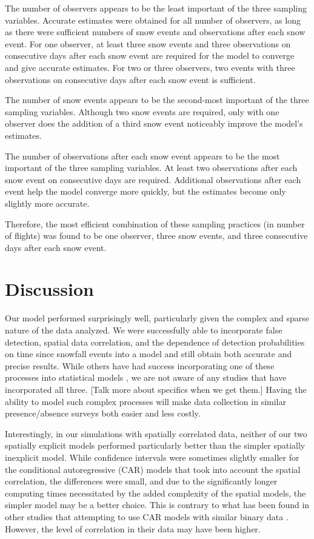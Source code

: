 \documentclass[11pt]{article}
\begin{document}
    The number of observers appears to be the least important of the three
    sampling variables.  Accurate estimates were obtained for all number of
    observers, as long as there were sufficient numbers of snow events and
    observations after each snow event.  For one observer, at least three snow
    events and three observations on consecutive days after each snow event are
    required for the model to converge and give accurate estimates.  For two or
    three observers, two events with three observations on consecutive days
    after each snow event is sufficient.

    The number of snow events appears to be the second-most important of the
    three sampling variables.  Although two snow events are required, only with
    one observer does the addition of a third snow event noticeably improve the
    model's estimates.

    The number of observations after each snow event appears to be the most
    important of the three sampling variables.  At least two observations after
    each snow event on consecutive days are required.  Additional observations
    after each event help the model converge more quickly, but the estimates
    become only slightly more accurate.

    Therefore, the most efficient combination of these sampling practices (in
    number of flights)  was found to be one observer, three snow events, and
    three consecutive days after each snow event.

\section{Discussion}

Our model performed surprisingly well, particularly given the complex and
sparse nature of the data analyzed. We were successfully able to incorporate
false detection, spatial data correlation, and the dependence of detection
probabilities on time since snowfall events into a model and still obtain both
accurate and precise results. While others have had success incorporating one
of these processes into statistical models \citep{Magoun2007, Royle2006,
Stanley2005}, we are not aware of any studies that have incorporated all three.
[Talk more about specifics when we get them.] Having the ability to model such
complex processes will make data collection in similar presence/absence surveys
both easier and less costly.

Interestingly, in our simulations with spatially correlated data, neither of
our two spatially explicit models performed particularly better than the
simpler spatially inexplicit model. While confidence intervals were sometimes
slightly smaller for the conditional autoregressive (CAR) models that took into
account the spatial correlation, the differences were small, and due to the
significantly longer computing times necessitated by the added complexity of
the spatial models, the simpler model may be a better choice. This is contrary
to what has been found in other studies that attempting to use CAR models with
similar binary data \citep{Wintle2006}.  However, the level of correlation in
their data may have been higher.
\end{document}
